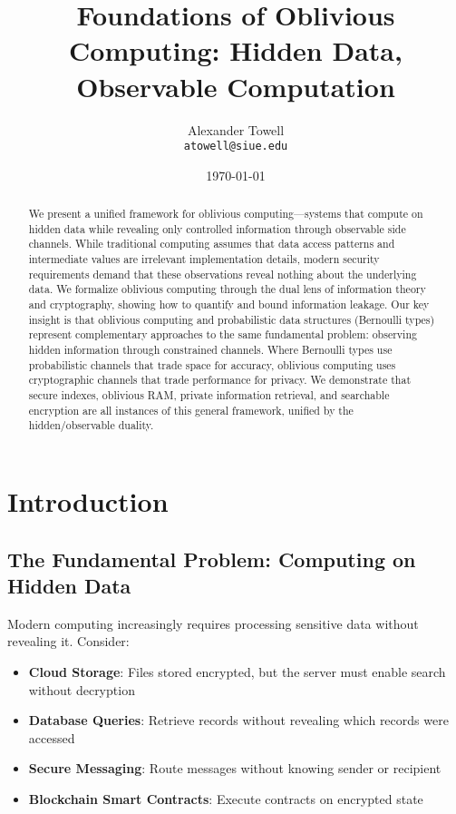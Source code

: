 \documentclass[11pt,final,hidelinks]{article}
\title{Foundations of Oblivious Computing: Hidden Data, Observable Computation}
\author{
    Alexander Towell\\
    \texttt{atowell@siue.edu}
}
\date{\today}
\begin{document}
\maketitle

\begin{abstract}
We present a unified framework for oblivious computing—systems that compute on hidden data while revealing only controlled information through observable side channels. While traditional computing assumes that data access patterns and intermediate values are irrelevant implementation details, modern security requirements demand that these observations reveal nothing about the underlying data. We formalize oblivious computing through the dual lens of information theory and cryptography, showing how to quantify and bound information leakage. Our key insight is that oblivious computing and probabilistic data structures (Bernoulli types) represent complementary approaches to the same fundamental problem: observing hidden information through constrained channels. Where Bernoulli types use probabilistic channels that trade space for accuracy, oblivious computing uses cryptographic channels that trade performance for privacy. We demonstrate that secure indexes, oblivious RAM, private information retrieval, and searchable encryption are all instances of this general framework, unified by the hidden/observable duality.
\end{abstract}

\section{Introduction}

\subsection{The Fundamental Problem: Computing on Hidden Data}

Modern computing increasingly requires processing sensitive data without revealing it. Consider:

\begin{itemize}
    \item \textbf{Cloud Storage}: Files stored encrypted, but the server must enable search without decryption
    \item \textbf{Database Queries}: Retrieve records without revealing which records were accessed
    \item \textbf{Secure Messaging}: Route messages without knowing sender or recipient
    \item \textbf{Blockchain Smart Contracts}: Execute contracts on encrypted state
\end{itemize}
\end{document}
